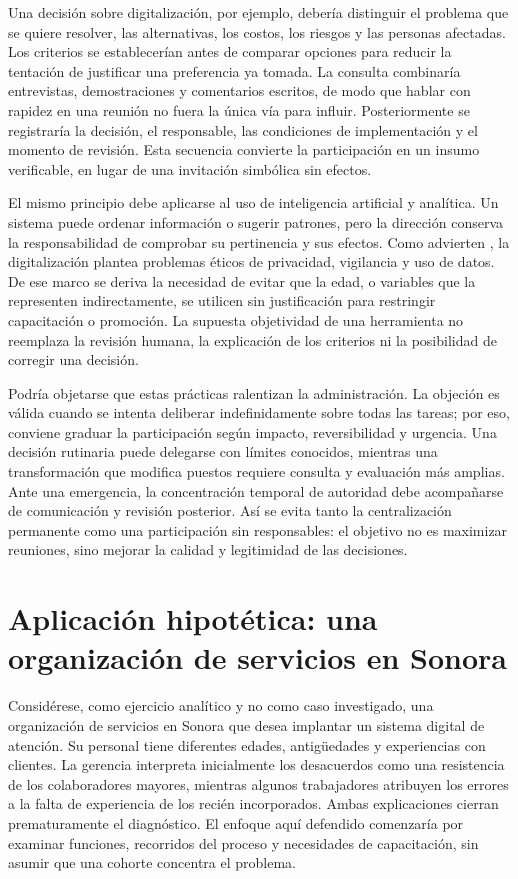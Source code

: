 \documentclass[12pt,letterpaper,oneside]{article}
\begin{document}
Una decisión sobre digitalización, por ejemplo, debería distinguir el problema que se quiere resolver, las alternativas, los costos, los riesgos y las personas afectadas. Los criterios se establecerían antes de comparar opciones para reducir la tentación de justificar una preferencia ya tomada. La consulta combinaría entrevistas, demostraciones y comentarios escritos, de modo que hablar con rapidez en una reunión no fuera la única vía para influir. Posteriormente se registraría la decisión, el responsable, las condiciones de implementación y el momento de revisión. Esta secuencia convierte la participación en un insumo verificable, en lugar de una invitación simbólica sin efectos.

El mismo principio debe aplicarse al uso de inteligencia artificial y analítica. Un sistema puede ordenar información o sugerir patrones, pero la dirección conserva la responsabilidad de comprobar su pertinencia y sus efectos. Como advierten \textcite{cortellazzo2019}, la digitalización plantea problemas éticos de privacidad, vigilancia y uso de datos. De ese marco se deriva la necesidad de evitar que la edad, o variables que la representen indirectamente, se utilicen sin justificación para restringir capacitación o promoción. La supuesta objetividad de una herramienta no reemplaza la revisión humana, la explicación de los criterios ni la posibilidad de corregir una decisión.

Podría objetarse que estas prácticas ralentizan la administración. La objeción es válida cuando se intenta deliberar indefinidamente sobre todas las tareas; por eso, conviene graduar la participación según impacto, reversibilidad y urgencia. Una decisión rutinaria puede delegarse con límites conocidos, mientras una transformación que modifica puestos requiere consulta y evaluación más amplias. Ante una emergencia, la concentración temporal de autoridad debe acompañarse de comunicación y revisión posterior. Así se evita tanto la centralización permanente como una participación sin responsables: el objetivo no es maximizar reuniones, sino mejorar la calidad y legitimidad de las decisiones.

\section*{Aplicación hipotética: una organización de servicios en Sonora}

Considérese, como ejercicio analítico y no como caso investigado, una organización de servicios en Sonora que desea implantar un sistema digital de atención. Su personal tiene diferentes edades, antigüedades y experiencias con clientes. La gerencia interpreta inicialmente los desacuerdos como una resistencia de los colaboradores mayores, mientras algunos trabajadores atribuyen los errores a la falta de experiencia de los recién incorporados. Ambas explicaciones cierran prematuramente el diagnóstico. El enfoque aquí defendido comenzaría por examinar funciones, recorridos del proceso y necesidades de capacitación, sin asumir que una cohorte concentra el problema.
\end{document}
